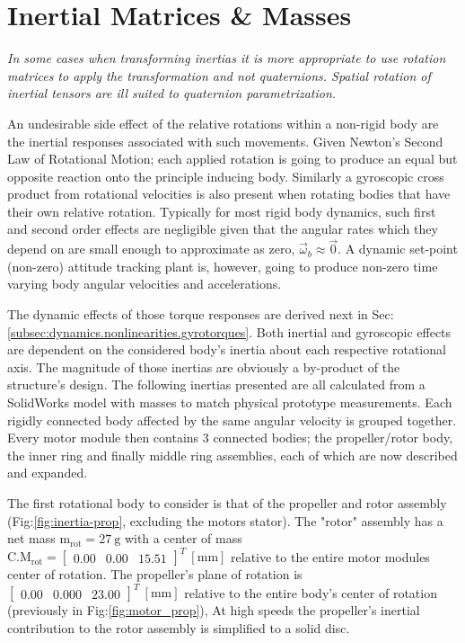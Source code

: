 \section{Inertial Matrices \& Masses}
\label{sec:proto.inertia}
\emph{\color{Gray}In some cases when transforming inertias it is more appropriate to use rotation matrices to apply the transformation and not quaternions. Spatial rotation of inertial tensors are ill suited to quaternion parametrization.}
\par
An undesirable side effect of the relative rotations within a non-rigid body are the inertial responses associated with such movements. Given Newton's Second Law of Rotational Motion; each applied rotation is going to produce an equal but opposite reaction onto the principle inducing body. Similarly a gyroscopic cross product from rotational velocities is also present when rotating bodies that have their own relative rotation. Typically for most rigid body dynamics, such first and second order effects are negligible given that the angular rates which they depend on are small enough to approximate as zero, $\vec{\omega}_b\approx\vec{0}$. A dynamic set-point (non-zero) attitude tracking plant is, however, going to produce non-zero time varying body angular velocities and accelerations.
\par
The dynamic effects of those torque responses are derived next in Sec:\ref{subsec:dynamics.nonlinearities.gyrotorques}. Both inertial and gyroscopic effects are dependent on the considered body's inertia about each respective rotational axis. The magnitude of those inertias are obviously a by-product of the structure's design. The following inertias presented are all calculated from a SolidWorks model with masses to match physical prototype measurements. Each rigidly connected body affected by the same angular velocity is grouped together. Every motor module then contains 3 connected bodies; the propeller/rotor body, the inner ring and finally middle ring assemblies, each of which are now described and expanded. 
\par
The first rotational body to consider is that of the propeller and rotor assembly (Fig:\ref{fig:inertia-prop}, excluding the motors stator). The "rotor" assembly has a net mass $\text{m}_{\text{rot}}=27~\text{g}$ with a center of mass $\text{C.M}_{\text{rot}}=\begin{bmatrix}0.00&0.00&15.51\end{bmatrix}^T~[\text{mm}]$ relative to the entire motor modules center of rotation. The propeller's plane of rotation is $\begin{bmatrix}0.00&0.000&23.00\end{bmatrix}^T~[\text{mm}]$ relative to the entire body's center of rotation (previously in Fig:\ref{fig:motor_prop}), At high speeds the propeller's inertial contribution to the rotor assembly is simplified to a solid disc. 
